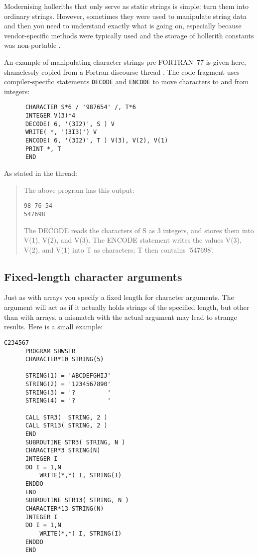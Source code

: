 Modernising holleriths that only serve as static strings is simple: turn them into ordinary
strings. However, sometimes they were used to manipulate string data and then you need
to understand exactly what is going on, especially because vendor-specific methods were
typically used and the storage of hollerith constants was non-portable \cite{HollerithConstant}.

An example of manipulating character strings pre-FORTRAN~77 is given here, shamelessly
copied from a Fortran discourse thread \cite{BafflingCode}. The code fragment uses compiler-specific
statements \verb+DECODE+ and \verb+ENCODE+ to move characters to and from integers:
\begin{verbatim}
      CHARACTER S*6 / '987654' /, T*6
      INTEGER V(3)*4
      DECODE( 6, '(3I2)', S ) V
      WRITE( *, '(3I3)') V
      ENCODE( 6, '(3I2)', T ) V(3), V(2), V(1)
      PRINT *, T
      END
\end{verbatim}

As stated in the thread:
\begin{quote}
The above program has this output:

\begin{verbatim}
98 76 54
547698
\end{verbatim}

The DECODE reads the characters of S as 3 integers, and stores them into V(1), V(2), and V(3).
The ENCODE statement writes the values V(3), V(2), and V(1) into T as characters; T then contains '547698'.
\end{quote}


\subsection{Fixed-length character arguments}
Just as with arrays you specify a fixed length for character arguments. The argument will act as if it actually
holds strings of the specified length, but other than with arrays, a mismatch with the actual argument may lead
to strange results. Here is a small example:
\begin{verbatim}
C234567
      PROGRAM SHWSTR
      CHARACTER*10 STRING(5)

      STRING(1) = 'ABCDEFGHIJ'
      STRING(2) = '1234567890'
      STRING(3) = '?         '
      STRING(4) = '?         '

      CALL STR3(  STRING, 2 )
      CALL STR13( STRING, 2 )
      END
      SUBROUTINE STR3( STRING, N )
      CHARACTER*3 STRING(N)
      INTEGER I
      DO I = 1,N
          WRITE(*,*) I, STRING(I)
      ENDDO
      END
      SUBROUTINE STR13( STRING, N )
      CHARACTER*13 STRING(N)
      INTEGER I
      DO I = 1,N
          WRITE(*,*) I, STRING(I)
      ENDDO
      END
\end{verbatim}

